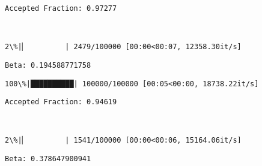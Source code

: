\documentclass[11pt]{article}
\begin{document}
    \begin{Verbatim}[commandchars=\\\{\}]
Accepted Fraction: 0.97277

    \end{Verbatim}

    \begin{center}
    \end{center}
    { \hspace*{\fill} \\}
    
    \begin{Verbatim}[commandchars=\\\{\}]
  2\%|▏         | 2479/100000 [00:00<00:07, 12358.30it/s]
    \end{Verbatim}

    \begin{Verbatim}[commandchars=\\\{\}]
Beta: 0.194588771758

    \end{Verbatim}

    \begin{Verbatim}[commandchars=\\\{\}]
100\%|██████████| 100000/100000 [00:05<00:00, 18738.22it/s]

    \end{Verbatim}

    \begin{Verbatim}[commandchars=\\\{\}]
Accepted Fraction: 0.94619

    \end{Verbatim}

    \begin{center}
    \end{center}
    { \hspace*{\fill} \\}
    
    \begin{Verbatim}[commandchars=\\\{\}]
  2\%|▏         | 1541/100000 [00:00<00:06, 15164.06it/s]
    \end{Verbatim}

    \begin{Verbatim}[commandchars=\\\{\}]
Beta: 0.378647900941

    \end{Verbatim}
\end{document}
